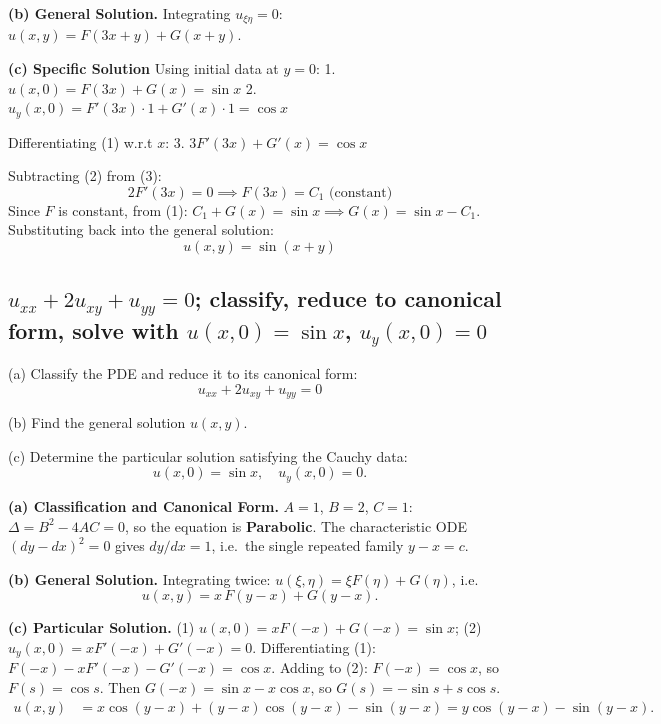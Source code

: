 \documentclass[a4paper,11pt]{article} %
\begin{document}
\textbf{(b) General Solution.}
Integrating $u_{\xi\eta}=0$: $u(x,y)=F(3x+y)+G(x+y)$.

\textbf{(c) Specific Solution}
Using initial data at $y=0$:
1. $u(x,0) = F(3x) + G(x) = \sin x$
2. $u_y(x,0) = F'(3x)\cdot 1 + G'(x)\cdot 1 = \cos x$

Differentiating (1) w.r.t $x$:
3. $3F'(3x) + G'(x) = \cos x$

Subtracting (2) from (3):
$$ 2F'(3x) = 0 \implies F(3x) = C_1 \text{ (constant)} $$
Since $F$ is constant, from (1): $C_1 + G(x) = \sin x \implies G(x) = \sin x - C_1$.
Substituting back into the general solution:
$$ u(x,y) = \sin(x+y) $$

\newpage
\subsection{\texorpdfstring{$u_{xx} + 2u_{xy} + u_{yy} = 0$; classify, reduce to canonical form, solve with $u(x,0)=\sin x$, $u_y(x,0)=0$}{Classify parabolic PDE; single repeated characteristic; canonical form $u_{\xi\xi}=0$; general solution $xF(y-x)+G(y-x)$}}

\begin{problembox}
(a) Classify the PDE and reduce it to its canonical form:
$$u_{xx} + 2u_{xy} + u_{yy} = 0$$

(b) Find the general solution $u(x,y)$.

(c) Determine the particular solution satisfying the Cauchy data:
$$u(x, 0) = \sin x, \quad u_y(x, 0) = 0.$$
\end{problembox}

\textbf{(a) Classification and Canonical Form.} $A=1$, $B=2$, $C=1$: $\Delta = B^2-4AC = 0$, so the equation is \textbf{Parabolic}. The characteristic ODE $(dy-dx)^2=0$ gives $dy/dx=1$, i.e.\ the single repeated family $y-x=c$.

\textbf{(b) General Solution.}
Integrating twice: $u(\xi,\eta)=\xi F(\eta)+G(\eta)$, i.e.\
$$ u(x,y) = x\,F(y-x) + G(y-x). $$

\textbf{(c) Particular Solution.}
(1) $u(x,0)=xF(-x)+G(-x)=\sin x$; \quad (2) $u_y(x,0)=xF'(-x)+G'(-x)=0$.
Differentiating (1): $F(-x)-xF'(-x)-G'(-x)=\cos x$. Adding to (2): $F(-x)=\cos x$, so $F(s)=\cos s$.
Then $G(-x)=\sin x-x\cos x$, so $G(s)=-\sin s+s\cos s$.
\begin{align*}
u(x,y)&=x\cos(y-x)+(y-x)\cos(y-x)-\sin(y-x)=y\cos(y-x)-\sin(y-x).
\end{align*}
\end{document}
